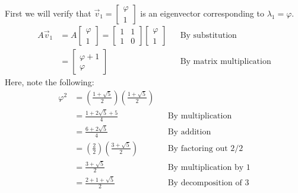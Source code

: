 \documentclass{article}
\newcommand{\reason}[1]{&& \text{#1}}
\begin{document}
\begin{enumerate}
        First we will verify that $\vec{v}_1 = \begin{bmatrix} \varphi \\ 1 \end{bmatrix}$ is an eigenvector corresponding to $\lambda_1=\varphi$.
        \begin{align*}
          A\vec{v}_1 & = A \begin{bmatrix}
                             \varphi \\ 1
                           \end{bmatrix} = \begin{bmatrix}
                                             1 & 1 \\
                                             1 & 0
                                           \end{bmatrix} \begin{bmatrix}
                                                           \varphi \\
                                                           1
                                                         \end{bmatrix}   \reason{By substitution} \\
                     & = \begin{bmatrix}
                           \varphi +1 \\
                           \varphi
                         \end{bmatrix} \reason{By matrix multiplication}
        \end{align*}
        Here, note the following:
        \begin{align*}
          \varphi^2 & = \left(\frac{1 + \sqrt{5}}{2}\right)\left(\frac{1 + \sqrt{5}}{2}\right)                      \\
                    & = \frac{1 + 2\sqrt{5} + 5}{4} \reason{By multiplication}                                      \\
                    & = \frac{6 + 2\sqrt{5}}{4} \reason{By addition}                                                \\
                    & = \left(\frac{2}{2}\right)\left(\frac{3 + \sqrt{5}}{2}\right) \reason{By factoring out $2/2$} \\
                    & = \frac{3 + \sqrt{5}}{2} \reason{By multiplication by $1$}                                    \\
                    & = \frac{2 + 1 + \sqrt{5}}{2} \reason{By decomposition of $3$}                                 \\

\end{align*}
\end{enumerate}
\end{document}
